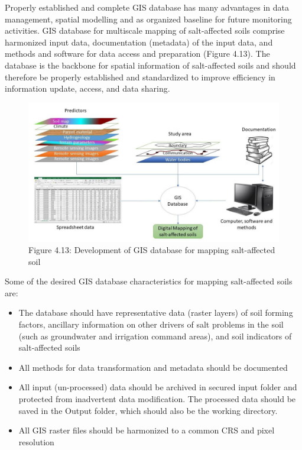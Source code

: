\documentclass[
  10pt,
  b5paper,
]{book}
\providecommand{\tightlist}{%
  \setlength{\itemsep}{0pt}\setlength{\parskip}{0pt}}
\begin{document}
Properly established and complete GIS database has many advantages in data management, spatial modelling and as organized baseline for future monitoring activities. GIS database for multiscale mapping of salt-affected soils comprise harmonized input data, documentation (metadata) of the input data, and methods and software for data access and preparation (Figure 4.13). The database is the backbone for spatial information of salt-affected soils and should therefore be properly established and standardized to improve efficiency in information update, access, and data sharing.

\begin{figure}
\centering
\includegraphics{figures/images/Figure4.13.PNG}
\caption{Figure 4.13: Development of GIS database for mapping salt-affected soil}
\end{figure}

Some of the desired GIS database characteristics for mapping salt-affected soils are:

\begin{itemize}
\tightlist
\item
  The database should have representative data (raster layers) of soil forming factors, ancillary information on other drivers of salt problems in the soil (such as groundwater and irrigation command areas), and soil indicators of salt-affected soils
\item
  All methods for data transformation and metadata should be documented
\item
  All input (un-processed) data should be archived in secured input folder and protected from inadvertent data modification. The processed data should be saved in the Output folder, which should also be the working directory.
\item
  All GIS raster files should be harmonized to a common CRS and pixel resolution
\end{itemize}
\end{document}
